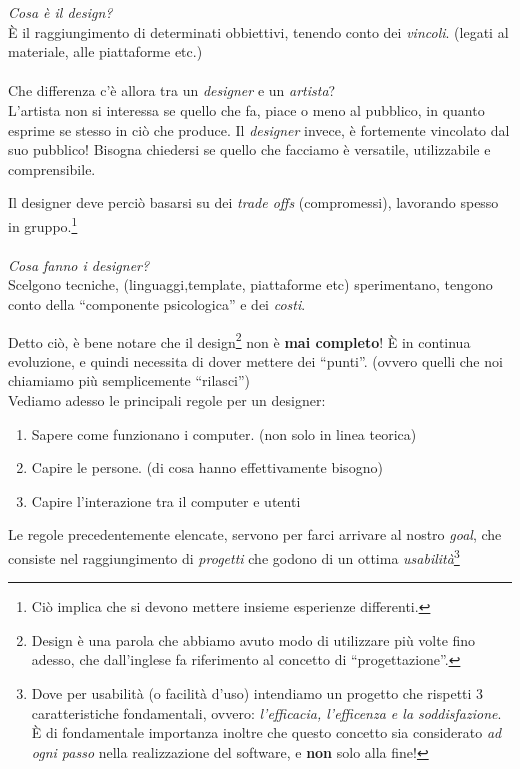\documentclass[oneside]{book}
\begin{document}
	\emph{Cosa è il design?} \\È il raggiungimento di determinati obbiettivi, tenendo conto dei \emph{vincoli}. (legati al materiale, alle piattaforme etc.) \\\\
	Che differenza c'è allora tra un \emph{designer} e un \emph{artista}? \\
	L'artista non si interessa se quello che fa, piace o meno al pubblico, in quanto esprime se stesso in ciò che produce. Il \emph{designer} invece, è fortemente vincolato dal suo pubblico! Bisogna chiedersi se quello che facciamo è versatile, utilizzabile e comprensibile.

	Il designer deve perciò basarsi su dei \emph{trade offs} (compromessi), lavorando spesso in gruppo.\footnote{Ciò implica che si devono mettere insieme esperienze differenti.} \\\\
	\emph{Cosa fanno i designer?} \\ Scelgono tecniche, (linguaggi,template, piattaforme etc) sperimentano, tengono conto della ``componente psicologica'' e dei \emph{costi}.

	Detto ciò, è bene notare che il design\footnote{ Design è una parola che abbiamo avuto modo di utilizzare più volte fino adesso, che dall'inglese fa riferimento al concetto di ``progettazione''.} non è \textbf{mai completo}! È in continua evoluzione, e quindi necessita di dover mettere dei ``punti''. (ovvero quelli che noi chiamiamo più semplicemente ``rilasci'') \\

	Vediamo adesso le principali regole per un designer:
	\begin{enumerate}
	\item Sapere come funzionano i computer. (non solo in linea teorica)
	\item Capire le persone. (di cosa hanno effettivamente bisogno)
	\item Capire l'interazione tra il computer e utenti
	\end{enumerate}
	Le regole precedentemente elencate, servono per farci arrivare al nostro \emph{goal}, che consiste nel raggiungimento di \emph{progetti} che godono di un ottima \emph{usabilità}\footnote{ Dove per usabilità (o facilità d'uso) intendiamo un progetto che rispetti 3 caratteristiche fondamentali, ovvero: \emph{l'efficacia, l'efficenza e la soddisfazione}. È di fondamentale importanza inoltre che questo concetto sia considerato \emph{ad ogni passo} nella realizzazione del software, e \textbf{non} solo alla fine!} \\
	
\end{document}
